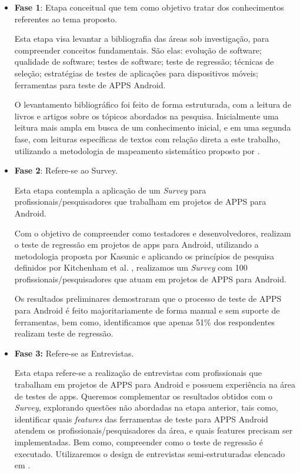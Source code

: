 \begin{itemize}
  \item \textbf{Fase 1}: Etapa conceitual que tem como objetivo tratar dos conhecimentos referentes ao tema proposto.
  
  Esta etapa visa levantar a bibliografia das áreas sob investigação, para compreender conceitos fundamentais. São elas: evolução de software; qualidade de software; testes de software; teste de regressão; técnicas de seleção; estratégias de testes de aplicações para dispositivos móveis; ferramentas para teste de \ac{APPS} Android.
  
  O levantamento bibliográfico foi feito de forma estruturada, com a leitura de livros e artigos sobre os tópicos abordados na pesquisa. Inicialmente uma leitura mais ampla em busca de um conhecimento inicial, e em uma segunda fase, com leituras específicas de textos com relação direta a este trabalho, utilizando a metodologia de mapeamento sistemático proposto por .
  
  \item \textbf{Fase 2}: Refere-se ao Survey.
  
  Esta etapa contempla a aplicação de um \textit{Survey} para profissionais/pesquisadores que trabalham em projetos de \ac{APPS} para Android.
  
  Com o objetivo de compreender como testadores e desenvolvedores, realizam o teste de regressão em projetos de apps para Android, utilizando a metodologia proposta por Kasunic  e aplicando os princípios de pesquisa definidos por Kitchenham et al. , realizamos um \textit{Survey} com 100 profissionais/pesquisadores que atuam em projetos de \ac{APPS} para Android. 
  
  Os resultados preliminares demostraram que o processo de teste de \ac{APPS} para Android é feito majoritariamente de forma manual e sem suporte de ferramentas, bem como, identificamos que apenas 51\% dos respondentes realizam teste de regressão.
 
  \item \textbf{Fase 3:} Refere-se as Entrevistas.
  
  Esta etapa refere-se a realização de entrevistas com profissionais que trabalham em projetos de \ac{APPS} para Android e possuem experiência na área de testes de apps. Queremos complementar os resultados obtidos com o \textit{Survey}, explorando questões não abordadas na etapa anterior, tais como, identificar quais \textit{features} das ferramentas de teste para \ac{APPS} Android atendem os profissionais/pesquisadores da área, e quais features precisam ser implementadas. Bem como, compreender como o teste de regressão é executado. Utilizaremos o design de entrevistas semi-estruturadas elencado em .
  

\end{itemize}
